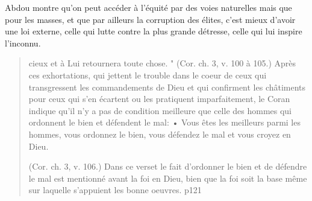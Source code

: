 \begin{Synthesis}
Abdou montre qu'on peut accéder à l'équité par des voies naturelles mais que pour les masses, et que par ailleurs la corruption des élites, c'est mieux d'avoir une loi externe, celle qui lutte contre la plus grande détresse, celle qui lui inspire l'inconnu.
\end{Synthesis}

\begin{quote}
    cieux et à
Lui retournera toute chose. " (Cor. ch. 3, v. 100 à 105.) Après ces
exhortations, qui jettent le trouble dans le coeur de ceux qui transgressent
les commandements de Dieu et qui confirment les châtiments pour ceux
qui s'en écartent ou les pratiquent imparfaitement, le Coran indique
qu'il n'y a pas de condition meilleure que celle des hommes qui ordonnent
le bien et défendent le mal: • Vous êtes les meilleurs parmi les hommes,
vous ordonnez le bien, vous défendez le mal et vous croyez en Dieu.
 
(Cor. ch. 3, v. 106.) Dans ce verset le fait d'ordonner le bien et de
défendre le mal est mentionné avant la foi en Dieu, bien que la foi soit la base même sur laquelle s'appuient les bonne oeuvres. 
p121
\end{quote}

